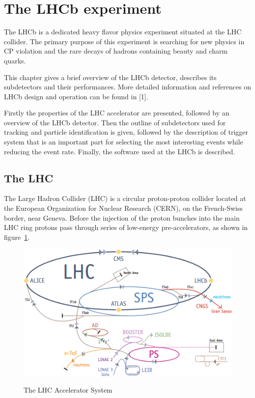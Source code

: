 \section{The LHCb experiment}

The LHCb is a dedicated heavy flavor physics experiment situated at the LHC
collider.
The primary purpose of this experiment is searching for new physics in CP
violation and the rare decays of hadrons containing beauty and charm quarks.

This chapter gives a brief overview of the LHCb detector, describes its
subdetectors and their performances. More detailed information and references
on LHCb design and operation can be found in [1].

Firstly the properties of the LHC accelerator are presented, followed by an
overview of the LHCb detector. Then the outline of subdetectors used for
tracking and particle identification is given, followed by the description of
trigger system that is an important part for selecting the most interesting
events while reducing the event rate. Finally, the software used at the LHCb
is described.

\subsection{The LHC}

The Large Hadron Collider (LHC) is a circular proton-proton collider  located
at the European Organization for Nuclear Research (CERN), on the French-Swiss
border, near Geneva. Before the injection of the proton bunches into the main
LHC ring protons pass through series of low-energy pre-accelerators, as shown
in figure~\ref{fig_lhc}.

\begin{figure}[H]
\includegraphics[width=\textwidth]{figs/lhc.png}
\label{fig_lhc}
\caption{The LHC Accelerator System}
\end{figure}

